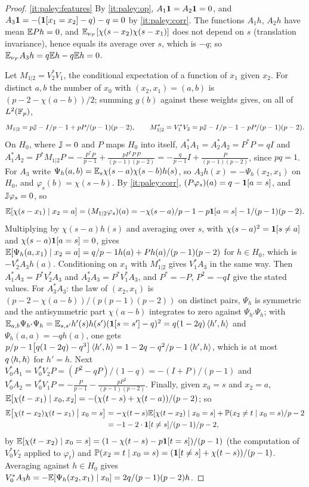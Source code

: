 \begin{proof}
\ref{it:paley:features} By \ref{it:paley:op}, $A_1\mathbf 1=A_2\mathbf 1=0$, and
$A_3\mathbf 1=-(\mathbf 1[x_1=x_2]-q)-q=0$ by \ref{it:paley:corr}. The functions $A_1h$, $A_2h$
have mean $\mathbb E Ph=0$, and $\mathbb E_{\nu_F}[\chi(s-x_2)\chi(s-x_1)]$ does not depend on $s$
(translation invariance), hence equals its average over $s$, which is $-q$; so
$\mathbb E_{\nu_F}A_3h=q\mathbb E h-q\mathbb E h=0$.

Let $M_{1|2}=V_2^*V_1$, the conditional expectation of a function of $x_1$ given
$x_2$. For distinct $a,b$ the number of $x_0$ with $(x_2,x_1)=(a,b)$ is
$(p-2-\chi(a-b))/2$; summing $g(b)$ against these weights gives, on all of
$L^2(\mathbb F_p)$,
\[
 M_{1|2}=p\mathbb J-I/p-1+pP/(p-1)(p-2),\qquad
 M_{1|2}^*=V_1^*V_2=p\mathbb J-I/p-1-pP/(p-1)(p-2) .
\]
On $H_0$, where $\mathbb J=0$ and $P$ maps $H_0$ into itself,
$A_1^*A_1=A_2^*A_2=P^*P=qI$ and
$A_1^*A_2=P^*M_{1|2}P=-\frac{P^*P}{p-1}+\frac{pP^*P\,P}{(p-1)(p-2)}
=-\frac q{p-1}I+\frac P{(p-1)(p-2)}$, since $pq=1$.
For $A_3$ write $\Psi_h(a,b)=\mathbb E_s\chi(s-a)\chi(s-b)h(s)$, so $A_3h(x)=-\Psi_h(x_2,x_1)$
on $H_0$, and $\varphi_s(b)=\chi(s-b)$. By \ref{it:paley:corr},
$(P\varphi_s)(a)=q-\mathbf 1[a=s]$, and $\mathbb J\varphi_s=0$, so
\[
 \mathbb E[\chi(s-x_1)\mid x_2=a]=(M_{1|2}\varphi_s)(a)
 =-\chi(s-a)/p-1-p\mathbf 1[a=s]-1/(p-1)(p-2) .
\]
Multiplying by $\chi(s-a)h(s)$ and averaging over $s$, with $\chi(s-a)^2=\mathbf 1[s\ne a]$
and $\chi(s-a)\mathbf 1[a=s]=0$, gives
$\mathbb E[\Psi_h(a,x_1)\mid x_2=a]=q/p-1h(a)+Ph(a)/(p-1)(p-2)$ for $h\in H_0$,
which is $-V_2^*A_3h(a)$. Conditioning on $x_1$ with $M_{1|2}^*$ gives $V_1^*A_3$ in
the same way. Then $A_1^*A_3=P^*V_2^*A_3$ and $A_2^*A_3=P^*V_1^*A_3$, and $P^*=-P$,
$P^2=-qI$ give the stated values. For $A_3^*A_3$: the law of $(x_2,x_1)$ is
$(p-2-\chi(a-b))/(p(p-1)(p-2))$ on distinct pairs, $\Psi_h$ is symmetric and the
antisymmetric part $\chi(a-b)$ integrates to zero against
$\Psi_{h'}\Psi_h$; with $\mathbb E_{a,b}\Psi_{h'}\Psi_h=\mathbb E_{s,s'}h'(s)h(s')(\mathbf 1[s=s']-q)^2
=q(1-2q)\left\langle h',h\right\rangle$ and $\Psi_h(a,a)=-qh(a)$, one gets
$p/p-1\bigl[q(1-2q)-q^3\bigr]\left\langle h',h\right\rangle=1-2q-q^2/p-1\left\langle h',h\right\rangle$, which is at
most $q\left\langle h,h\right\rangle$ for $h'=h$. Next $V_0^*A_1=V_0^*V_2P=(P^2-qP)/(1-q)=-(I+P)/(p-1)$
and $V_0^*A_2=V_0^*V_1P=-\frac P{p-1}-\frac{pP^2}{(p-1)(p-2)}$. Finally, given
$x_0=s$ and $x_2=a$, $\mathbb E[\chi(t-x_1)\mid x_0,x_2]=-(\chi(t-s)+\chi(t-a))/(p-2)$; so
\begin{align*}
 \mathbb E\bigl[\chi(t-x_2)\chi(t-x_1)\bigm|x_0=s\bigr]
 &=-\chi(t-s)\mathbb E[\chi(t-x_2)\mid x_0=s]+\mathbb P(x_2\ne t\mid x_0=s)/p-2\\
 &=-1-2\cdot\mathbf 1[t\ne s]/(p-1)/p-2,
\end{align*}
by $\mathbb E[\chi(t-x_2)\mid x_0=s]=(1-\chi(t-s)-p\mathbf 1[t=s])/(p-1)$ (the computation of
$V_0^*V_2$ applied to $\varphi_t$) and
$\mathbb P(x_2=t\mid x_0=s)=(\mathbf 1[t\ne s]+\chi(t-s))/(p-1)$. Averaging against $h\in H_0$
gives $V_0^*A_3h=-\mathbb E[\Psi_h(x_2,x_1)\mid x_0]=2q/(p-1)(p-2)h$.


\end{proof}
